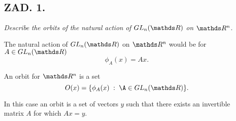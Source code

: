 \documentclass{article}[13pt]
\begin{document}
\subsection*{ZAD. 1.}
\emph{Describe the orbits of the natural action of $GL_n(\R)$ on $\R^n$.}

The natural action of $GL_n(\R)$ on $\R^n$ would be for $A\in GL_n(\R)$
$$\phi_A(x)=Ax.$$

An orbit for $\R^n$ is a set
$$O(x)=\{\phi_A(x)\;:\;\A\in GL_n(\R)\}.$$

In this case an orbit is a set of vectors $y$ such that there exists an invertible matrix $A$ for which $Ax=y$.
\end{document}
